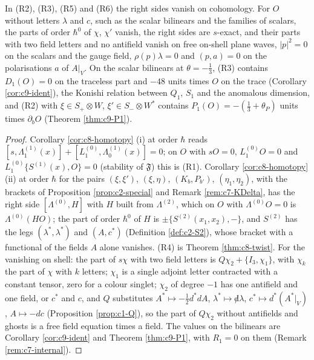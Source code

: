 \begin{proposition}
\begin{itemize}
\end{itemize}
In (R2), (R3), (R5) and (R6) the right sides vanish on cohomology. For $O$ without letters $\lambda$ and $c$, such as the scalar bilinears and the families of scalars, the parts of order $\hbar^0$ of $\chi$, $\chi'$ vanish, the right sides are $s$-exact, and their parts with two field letters and no antifield vanish on free on-shell plane waves, $|p|^2=0$ on the scalars and the gauge field, $\rho(p)\lambda=0$ and $(p,a)=0$ on the polarisations $a$ of $A|_V$. On the scalar bilinears at $\theta=-\tfrac13$, (R3) contains $D_1(O)=0$ on the traceless part and $-48$ units times $O$ on the trace (Corollary \ref{cor:c9-ident}), the Konishi relation between $Q_1$, $S_1$ and the anomalous dimension, and (R2) with $\xi\in S_+\otimes W$, $\xi'\in S_-\otimes W^*$ contains $P_1(O)=-(\tfrac13+\theta_P)$ units times $\partial_bO$ (Theorem \ref{thm:c9-P1}).
\end{proposition}

\begin{proof}
Corollary \ref{cor:c8-homotopy} (i) at order $\hbar$ reads $[s,\Lambda^{(1)}_1(x)]+[L_1^{(0)},\Lambda^{(1)}_0(x)]=0$; on $O$ with $sO=0$, $L_1^{(0)}O=0$ and $L_1^{(0)}\{S^{(1)}(x),O\}=0$ (stability of $\mathfrak F$) this is (R1). Corollary \ref{cor:c8-homotopy} (ii) at order $\hbar$ for the pairs $(\xi,\xi')$, $(\xi,\eta)$, $(K_b,P_{b'})$, $(\eta_1,\eta_2)$, with the brackets of Proposition \ref{prop:c2-special} and Remark \ref{rem:c7-KDelta}, has the right side $[\Lambda^{(0)},H]$ with $H$ built from $\Lambda^{(2)}$, which on $O$ with $\Lambda^{(0)}O=0$ is $\Lambda^{(0)}(HO)$; the part of order $\hbar^0$ of $H$ is $\pm\{S^{(2)}(x_1,x_2),-\}$, and $S^{(2)}$ has the legs $(\lambda^*,\lambda^*)$ and $(A,c^*)$ (Definition \ref{def:c2-S2}), whose bracket with a functional of the fields $A$ alone vanishes. (R4) is Theorem \ref{thm:c8-twist}. For the vanishing on shell: the part of $s\chi$ with two field letters is $Q\chi_2+\{I_3,\chi_1\}$, with $\chi_k$ the part of $\chi$ with $k$ letters; $\chi_1$ is a single adjoint letter contracted with a constant tensor, zero for a colour singlet; $\chi_2$ of degree $-1$ has one antifield and one field, or $c^*$ and $c$, and $Q$ substitutes $A^*\mapsto-\tfrac12d^*dA$, $\lambda^*\mapsto{\not d}\lambda$, $c^*\mapsto d^*(A^*|_V)$, $A\mapsto-dc$ (Proposition \ref{prop:c1-Q}), so the part of $Q\chi_2$ without antifields and ghosts is a free field equation times a field. The values on the bilinears are Corollary \ref{cor:c9-ident} and Theorem \ref{thm:c9-P1}, with $R_1=0$ on them (Remark \ref{rem:c7-internal}).
\end{proof}

